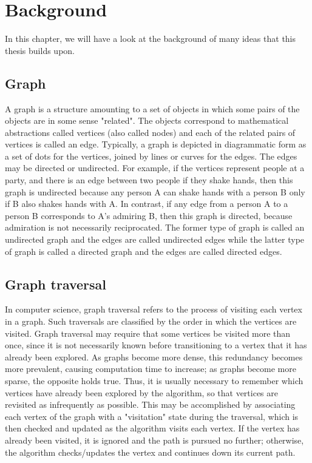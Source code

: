 \chapter{Background}
In this chapter, we will have a look at the background of many ideas that this thesis builds upon.

\section{Graph}
A graph is a structure amounting to a set of objects in which some pairs of the objects are in some sense "related". The objects correspond to mathematical abstractions called vertices (also called nodes) and each of the related pairs of vertices is called an edge. Typically, a graph is depicted in diagrammatic form as a set of dots for the vertices, joined by lines or curves for the edges. The edges may be directed or undirected. For example, if the vertices represent people at a party, and there is an edge between two people if they shake hands, then this graph is undirected because any person A can shake hands with a person B only if B also shakes hands with A. In contrast, if any edge from a person A to a person B corresponds to A's admiring B, then this graph is directed, because admiration is not necessarily reciprocated. The former type of graph is called an undirected graph and the edges are called undirected edges while the latter type of graph is called a directed graph and the edges are called directed edges.

\section{Graph traversal}
In computer science, graph traversal refers to the process of visiting each vertex in a graph. Such traversals are classified by the order in which the vertices are visited. Graph traversal may require that some vertices be visited more than once, since it is not necessarily known before transitioning to a vertex that it has already been explored. As graphs become more dense, this redundancy becomes more prevalent, causing computation time to increase; as graphs become more sparse, the opposite holds true.
Thus, it is usually necessary to remember which vertices have already been explored by the algorithm, so that vertices are revisited as infrequently as possible. This may be accomplished by associating each vertex of the graph with a "visitation" state during the traversal, which is then checked and updated as the algorithm visits each vertex. If the vertex has already been visited, it is ignored and the path is pursued no further; otherwise, the algorithm checks/updates the vertex and continues down its current path.

